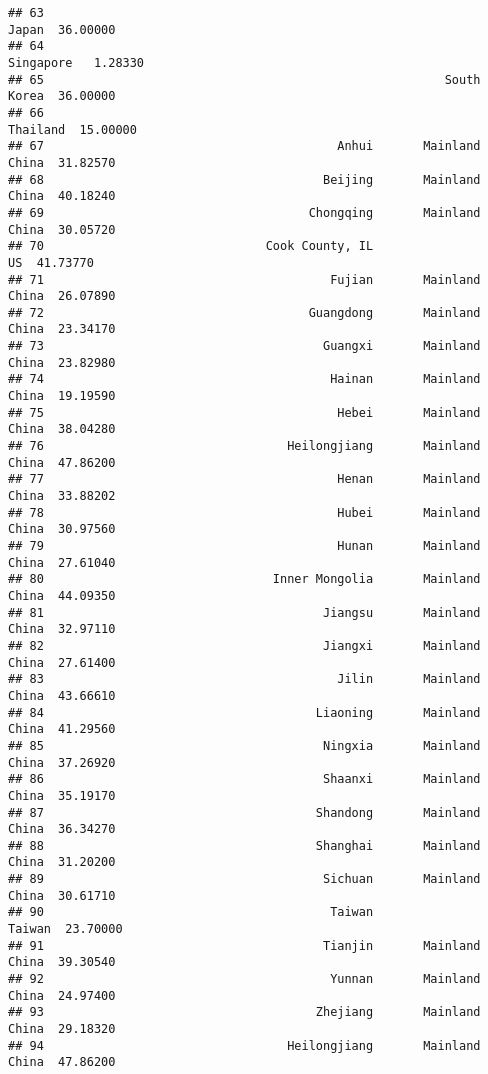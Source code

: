 \documentclass[
]{article}
\begin{document}
\begin{verbatim}
## 63                                                              Japan  36.00000
## 64                                                          Singapore   1.28330
## 65                                                        South Korea  36.00000
## 66                                                           Thailand  15.00000
## 67                                         Anhui       Mainland China  31.82570
## 68                                       Beijing       Mainland China  40.18240
## 69                                     Chongqing       Mainland China  30.05720
## 70                               Cook County, IL                   US  41.73770
## 71                                        Fujian       Mainland China  26.07890
## 72                                     Guangdong       Mainland China  23.34170
## 73                                       Guangxi       Mainland China  23.82980
## 74                                        Hainan       Mainland China  19.19590
## 75                                         Hebei       Mainland China  38.04280
## 76                                  Heilongjiang       Mainland China  47.86200
## 77                                         Henan       Mainland China  33.88202
## 78                                         Hubei       Mainland China  30.97560
## 79                                         Hunan       Mainland China  27.61040
## 80                                Inner Mongolia       Mainland China  44.09350
## 81                                       Jiangsu       Mainland China  32.97110
## 82                                       Jiangxi       Mainland China  27.61400
## 83                                         Jilin       Mainland China  43.66610
## 84                                      Liaoning       Mainland China  41.29560
## 85                                       Ningxia       Mainland China  37.26920
## 86                                       Shaanxi       Mainland China  35.19170
## 87                                      Shandong       Mainland China  36.34270
## 88                                      Shanghai       Mainland China  31.20200
## 89                                       Sichuan       Mainland China  30.61710
## 90                                        Taiwan               Taiwan  23.70000
## 91                                       Tianjin       Mainland China  39.30540
## 92                                        Yunnan       Mainland China  24.97400
## 93                                      Zhejiang       Mainland China  29.18320
## 94                                  Heilongjiang       Mainland China  47.86200

\end{verbatim}
\end{document}
